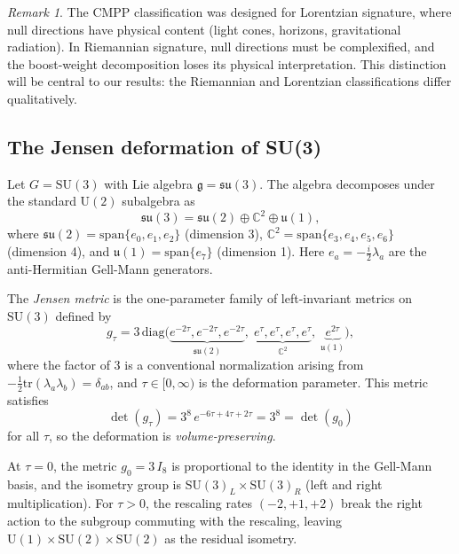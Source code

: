 \documentclass[12pt]{article}
\theoremstyle{definition}
\theoremstyle{remark}
\newtheorem{remark}[theorem]{Remark}
\begin{document}
\begin{remark}
The CMPP classification was designed for Lorentzian signature, where null directions have physical content (light cones, horizons, gravitational radiation).  In Riemannian signature, null directions must be complexified, and the boost-weight decomposition loses its physical interpretation.  This distinction will be central to our results: the Riemannian and Lorentzian classifications differ qualitatively.
\end{remark}

\subsection{The Jensen deformation of SU(3)}

Let $G=\mathrm{SU}(3)$ with Lie algebra $\mathfrak{g}=\mathfrak{su}(3)$.  The algebra decomposes under the standard $\mathrm{U}(2)$ subalgebra as
\begin{equation}
\label{eq:decomp}
\mathfrak{su}(3) = \mathfrak{su}(2) \oplus \mathbb{C}^2 \oplus \mathfrak{u}(1),
\end{equation}
where $\mathfrak{su}(2)=\mathrm{span}\{e_0,e_1,e_2\}$ (dimension 3), $\mathbb{C}^2=\mathrm{span}\{e_3,e_4,e_5,e_6\}$ (dimension 4), and $\mathfrak{u}(1)=\mathrm{span}\{e_7\}$ (dimension 1).  Here $e_a=-\frac{i}{2}\lambda_a$ are the anti-Hermitian Gell-Mann generators.

The \emph{Jensen metric} is the one-parameter family of left-invariant metrics on $\mathrm{SU}(3)$ defined by
\begin{equation}
\label{eq:jensen_metric}
g_\tau = 3\,\mathrm{diag}\!\bigl(\underbrace{e^{-2\tau},e^{-2\tau},e^{-2\tau}}_{\mathfrak{su}(2)},\;\underbrace{e^{\tau},e^{\tau},e^{\tau},e^{\tau}}_{\mathbb{C}^2},\;\underbrace{e^{2\tau}}_{\mathfrak{u}(1)}\bigr),
\end{equation}
where the factor of 3 is a conventional normalization arising from $-\frac{1}{2}\mathrm{tr}(\lambda_a\lambda_b)=\delta_{ab}$, and $\tau\in[0,\infty)$ is the deformation parameter.  This metric satisfies
\begin{equation}
\det(g_\tau) = 3^8\, e^{-6\tau+4\tau+2\tau} = 3^8 = \det(g_0)
\end{equation}
for all $\tau$, so the deformation is \emph{volume-preserving}.

At $\tau=0$, the metric $g_0=3\,I_8$ is proportional to the identity in the Gell-Mann basis, and the isometry group is $\mathrm{SU}(3)_L\times\mathrm{SU}(3)_R$ (left and right multiplication).  For $\tau>0$, the rescaling rates $(-2,+1,+2)$ break the right action to the subgroup commuting with the rescaling, leaving $\mathrm{U}(1)\times\mathrm{SU}(2)\times\mathrm{SU}(2)$ as the residual isometry.
\end{document}
